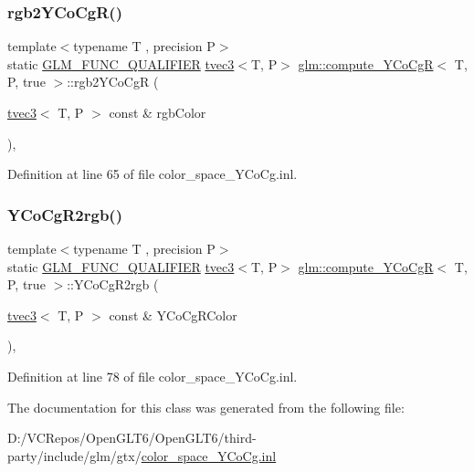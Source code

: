 \subsubsection{\texorpdfstring{rgb2YCoCgR()}{rgb2YCoCgR()}}
{\footnotesize\ttfamily template$<$typename T , precision P$>$ \\
static \mbox{\hyperlink{setup_8hpp_a33fdea6f91c5f834105f7415e2a64407}{G\+L\+M\+\_\+\+F\+U\+N\+C\+\_\+\+Q\+U\+A\+L\+I\+F\+I\+ER}} \mbox{\hyperlink{structglm_1_1tvec3}{tvec3}}$<$T, P$>$ \mbox{\hyperlink{classglm_1_1compute___y_co_cg_r}{glm\+::compute\+\_\+\+Y\+Co\+CgR}}$<$ T, P, true $>$\+::rgb2\+Y\+Co\+CgR (\begin{DoxyParamCaption}\item[{\mbox{\hyperlink{structglm_1_1tvec3}{tvec3}}$<$ T, P $>$ const \&}]{rgb\+Color }\end{DoxyParamCaption})\hspace{0.3cm}{\ttfamily [inline]}, {\ttfamily [static]}}



Definition at line 65 of file color\+\_\+space\+\_\+\+Y\+Co\+Cg.\+inl.

\mbox{\label{classglm_1_1compute___y_co_cg_r_3_01_t_00_01_p_00_01true_01_4_a06da2d71b6b47d04e9579eef10022cbb}} 
\subsubsection{\texorpdfstring{YCoCgR2rgb()}{YCoCgR2rgb()}}
{\footnotesize\ttfamily template$<$typename T , precision P$>$ \\
static \mbox{\hyperlink{setup_8hpp_a33fdea6f91c5f834105f7415e2a64407}{G\+L\+M\+\_\+\+F\+U\+N\+C\+\_\+\+Q\+U\+A\+L\+I\+F\+I\+ER}} \mbox{\hyperlink{structglm_1_1tvec3}{tvec3}}$<$T, P$>$ \mbox{\hyperlink{classglm_1_1compute___y_co_cg_r}{glm\+::compute\+\_\+\+Y\+Co\+CgR}}$<$ T, P, true $>$\+::Y\+Co\+Cg\+R2rgb (\begin{DoxyParamCaption}\item[{\mbox{\hyperlink{structglm_1_1tvec3}{tvec3}}$<$ T, P $>$ const \&}]{Y\+Co\+Cg\+R\+Color }\end{DoxyParamCaption})\hspace{0.3cm}{\ttfamily [inline]}, {\ttfamily [static]}}



Definition at line 78 of file color\+\_\+space\+\_\+\+Y\+Co\+Cg.\+inl.



The documentation for this class was generated from the following file\+:\begin{DoxyCompactItemize}
\item 
D\+:/\+V\+C\+Repos/\+Open\+G\+L\+T6/\+Open\+G\+L\+T6/third-\/party/include/glm/gtx/\mbox{\hyperlink{color__space___y_co_cg_8inl}{color\+\_\+space\+\_\+\+Y\+Co\+Cg.\+inl}}\end{DoxyCompactItemize}
